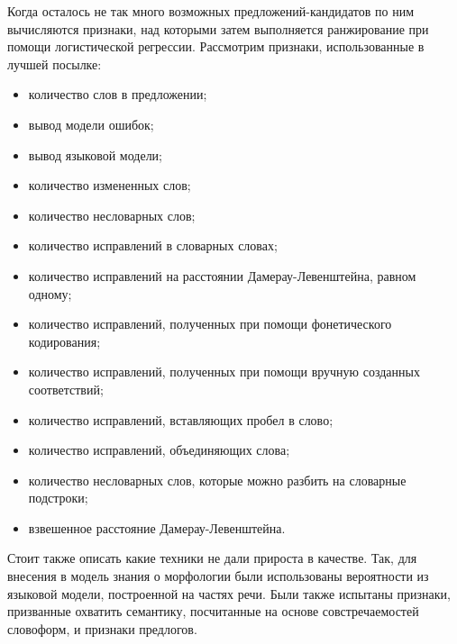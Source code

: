 \begin{enumerate}
	Когда осталось не так много возможных предложений-кандидатов по ним вычисляются признаки, над которыми затем выполняется ранжирование при помощи логистической регрессии. Рассмотрим признаки, использованные в лучшей посылке:
	\begin{itemize}
		\item количество слов в предложении;
		\item вывод модели ошибок;
		\item вывод языковой модели;
		\item количество измененных слов;
		\item количество несловарных слов;
		\item количество исправлений в словарных словах;
		\item количество исправлений на расстоянии Дамерау-Левенштейна, равном одному;
		\item количество исправлений, полученных при помощи фонетического кодирования;
		\item количество исправлений, полученных при помощи вручную созданных соответствий;
		\item количество исправлений, вставляющих пробел в слово;
		\item количество исправлений, объединяющих слова;
		\item количество несловарных слов, которые можно разбить на словарные подстроки;
		\item взвешенное расстояние Дамерау-Левенштейна.
	\end{itemize}
\end{enumerate}

Стоит также описать какие техники не дали прироста в качестве. Так, для внесения в модель знания о морфологии были использованы вероятности из языковой модели, построенной на частях речи. Были также испытаны признаки, призванные охватить семантику, посчитанные на основе совстречаемостей словоформ, и признаки предлогов.
